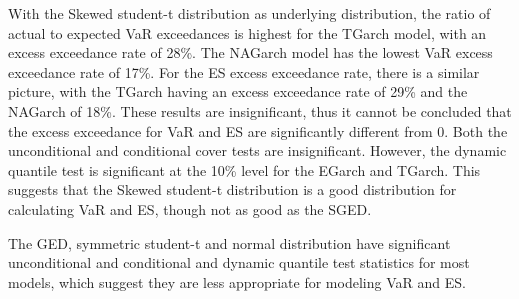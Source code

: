 \documentclass[a4paper, twoside]{templates/ociamthesis}
\begin{document}
With the Skewed student-t distribution as underlying distribution, the ratio of actual to expected VaR exceedances is highest for the TGarch model, with an excess exceedance rate of 28\%. The NAGarch model has the lowest VaR excess exceedance rate of 17\%. For the ES excess exceedance rate, there is a similar picture, with the TGarch having an excess exceedance rate of 29\% and the NAGarch of 18\%. These results are insignificant, thus it cannot be concluded that the excess exceedance for VaR and ES are significantly different from 0. Both the unconditional and conditional cover tests are insignificant. However, the dynamic quantile test is significant at the 10\% level for the EGarch and TGarch. This suggests that the Skewed student-t distribution is a good distribution for calculating VaR and ES, though not as good as the SGED.

The GED, symmetric student-t and normal distribution have significant unconditional and conditional and dynamic quantile test statistics for most models, which suggest they are less appropriate for modeling VaR and ES.

\newpage
\end{document}
